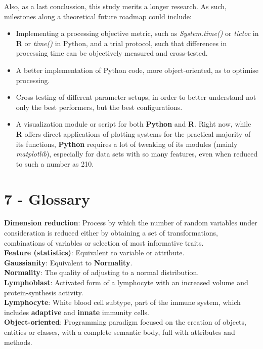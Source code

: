 \documentclass[]{article}
\begin{document}
Also, as a last conclussion, this study merits a longer research. As
such, milestones along a theoretical future roadmap could include:

\begin{itemize}
\itemsep1pt\parskip0pt
\item
  Implementing a processing objective metric, such as
  \emph{System.time()} or \emph{tictoc} in \textbf{R} or \emph{time()}
  in Python, and a trial protocol, such that differences in processing
  time can be objectively measured and cross-tested.
\item
  A better implementation of Python code, more object-oriented, as to
  optimise processing.\\
\item
  Cross-testing of different parameter setups, in order to better
  understand not only the best performers, but the best
  configurations.\\
\item
  A visualization module or script for both \textbf{Python} and
  \textbf{R}. Right now, while \textbf{R} offers direct applications of
  plotting systems for the practical majority of its functions,
  \textbf{Python} requires a lot of tweaking of its modules (mainly
  \emph{matplotlib}), especially for data sets with so many features,
  even when reduced to such a number as 210.
\end{itemize}

\pagebreak  

\section{7 - Glossary}\label{glossary}

\textbf{Dimension reduction}: Process by which the number of random
variables under consideration is reduced either by obtaining a set of
transformations, combinations of variables or selection of most
informative traits.\\\textbf{Feature (statistics)}: Equivalent to
variable or attribute.\\\textbf{Gaussianity}: Equivalent to
\textbf{Normality}.\\\textbf{Normality}: The quality of adjusting to a
normal distribution.\\\textbf{Lymphoblast}: Activated form of a
lymphocyte with an increased volume and protein-synthesis
activity.\\\textbf{Lymphocyte}: White blood cell subtype, part of the
immune system, which includes \textbf{adaptive} and \textbf{innate}
immunity cells.\\\textbf{Object-oriented}: Programming paradigm focused
on the creation of objects, entities or classes, with a complete
semantic body, full with attributes and methods.
\end{document}

